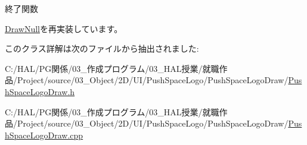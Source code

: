 終了関数 



\mbox{\hyperlink{class_draw_null_a12d44e341c7364b5ab9cdd661dc16187}{Draw\+Null}}を再実装しています。



このクラス詳解は次のファイルから抽出されました\+:\begin{DoxyCompactItemize}
\item 
C\+:/\+H\+A\+L/\+P\+G関係/03\+\_\+作成プログラム/03\+\_\+\+H\+A\+L授業/就職作品/\+Project/source/03\+\_\+\+Object/2\+D/\+U\+I/\+Push\+Space\+Logo/\+Push\+Space\+Logo\+Draw/\mbox{\hyperlink{_push_space_logo_draw_8h}{Push\+Space\+Logo\+Draw.\+h}}\item 
C\+:/\+H\+A\+L/\+P\+G関係/03\+\_\+作成プログラム/03\+\_\+\+H\+A\+L授業/就職作品/\+Project/source/03\+\_\+\+Object/2\+D/\+U\+I/\+Push\+Space\+Logo/\+Push\+Space\+Logo\+Draw/\mbox{\hyperlink{_push_space_logo_draw_8cpp}{Push\+Space\+Logo\+Draw.\+cpp}}\end{DoxyCompactItemize}
